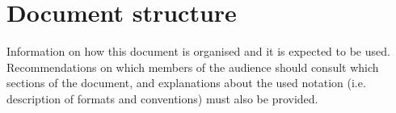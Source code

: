 \section{Document structure}  
Information on how this document is organised and it is expected to be
used. Recommendations on which members of the audience
should consult which sections of the document, and explanations about the used
notation (i.e. description of formats and conventions) must also be provided.\\









